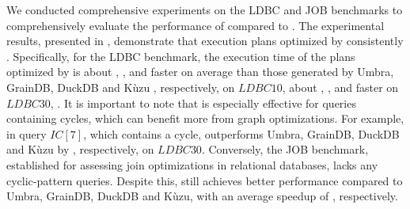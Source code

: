We conducted comprehensive experiments on the LDBC and JOB benchmarks to comprehensively evaluate the performance of \name compared to . The experimental results, presented in , demonstrate that execution plans optimized by \name consistently .
Specifically, for the LDBC benchmark, the execution time of the plans optimized by \name is about , ,  and  faster on average than those generated by Umbra, GrainDB, DuckDB and Kùzu , respectively, on $LDBC10$, about , ,  and  faster on $LDBC30$, . It is important to note that \name is especially effective for queries containing cycles, which can benefit more from graph optimizations. For example, in query $IC[7]$, which contains a cycle, \name outperforms Umbra, GrainDB, DuckDB and Kùzu by , respectively, on $LDBC30$.
Conversely, the JOB benchmark, established for assessing join optimizations in relational databases, lacks any cyclic-pattern queries. Despite this, \name still achieves better performance compared to Umbra, GrainDB, DuckDB and Kùzu, with an average speedup of , respectively.



